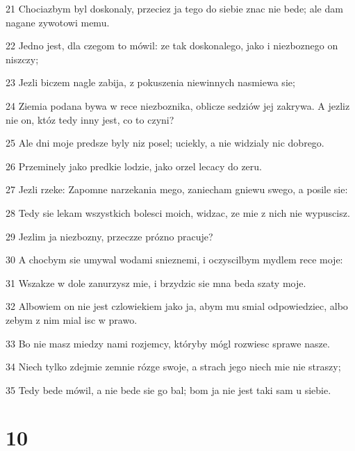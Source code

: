 \par 21 Chociazbym byl doskonaly, przeciez ja tego do siebie znac nie bede; ale dam nagane zywotowi memu.
\par 22 Jedno jest, dla czegom to mówil: ze tak doskonalego, jako i niezboznego on niszczy;
\par 23 Jezli biczem nagle zabija, z pokuszenia niewinnych nasmiewa sie;
\par 24 Ziemia podana bywa w rece niezboznika, oblicze sedziów jej zakrywa. A jezliz nie on, któz tedy inny jest, co to czyni?
\par 25 Ale dni moje predsze byly niz posel; uciekly, a nie widzialy nic dobrego.
\par 26 Przeminely jako predkie lodzie, jako orzel lecacy do zeru.
\par 27 Jezli rzeke: Zapomne narzekania mego, zaniecham gniewu swego, a posile sie:
\par 28 Tedy sie lekam wszystkich bolesci moich, widzac, ze mie z nich nie wypuscisz.
\par 29 Jezlim ja niezbozny, przeczze prózno pracuje?
\par 30 A chocbym sie umywal wodami snieznemi, i oczyscilbym mydlem rece moje:
\par 31 Wszakze w dole zanurzysz mie, i brzydzic sie mna beda szaty moje.
\par 32 Albowiem on nie jest czlowiekiem jako ja, abym mu smial odpowiedziec, albo zebym z nim mial isc w prawo.
\par 33 Bo nie masz miedzy nami rozjemcy, któryby mógl rozwiesc sprawe nasze.
\par 34 Niech tylko zdejmie zemnie rózge swoje, a strach jego niech mie nie straszy;
\par 35 Tedy bede mówil, a nie bede sie go bal; bom ja nie jest taki sam u siebie.

\chapter{10}

